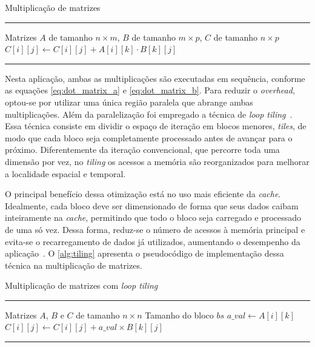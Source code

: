 \begin{algorithm}[htb]
	\caption{Multiplicação de matrizes}
	\label{alg:mul_matrix}
	\hrule
	\begin{algorithmic}[1]
		\REQUIRE Matrizes $A$ de tamanho $n \times m$, $B$ de tamanho $m \times p$, $C$ de tamanho $n \times p$
		\STATE $C[i][j] \gets C[i][j] + A[i][k] \cdot B[k][j]$
		\ENDFOR
		\ENDFOR
		\ENDFOR
	\end{algorithmic}
	\hrule
\end{algorithm}

Nesta aplicação, ambas as multiplicações são executadas em sequência, conforme as equações \autoref{eq:dot_matrix_a} e \autoref{eq:dot_matrix_b}. Para reduzir o \textit{overhead}, optou-se por utilizar uma única região paralela que abrange ambas multiplicações. Além da paralelização foi empregado a técnica de \textit{loop tiling}~\cite{bakos2016}. Essa técnica consiste em dividir o espaço de iteração em blocos menores, \textit{tiles}, de modo que cada bloco seja completamente processado antes de avançar para o próximo. Diferentemente da iteração convencional, que percorre toda uma dimensão por vez, no \textit{tiling} os acessos a memória são reorganizados para melhorar a localidade espacial e temporal.

O principal benefício dessa otimização está no uso mais eficiente da \textit{cache}. Idealmente, cada bloco deve ser dimensionado de forma que seus dados caibam inteiramente na \textit{cache}, permitindo que todo o bloco seja carregado e processado de uma só vez. Dessa forma, reduz-se o número de acessos à memória principal e evita-se o recarregamento de dados já utilizados, aumentando o desempenho da aplicação~\cite{bakos2016}. O \autoref{alg:tiling} apresenta o pseudocódigo de implementação dessa técnica na multiplicação de matrizes.

\begin{algorithm}[htb]
	\caption{Multiplicação de matrizes com \textit{loop tiling}}
	\label{alg:tiling}
	\hrule
	\begin{algorithmic}[1]
		\REQUIRE Matrizes $A$, $B$ e $C$ de tamanho $n \times n$
		\REQUIRE Tamanho do bloco $bs$
		\STATE $a\_val \gets A[i][k]$
		\STATE $C[i][j] \gets C[i][j] + a\_val \times B[k][j]$
		\ENDFOR
		\ENDFOR
		\ENDFOR
		\ENDFOR
		\ENDFOR
	\end{algorithmic}
	\hrule
	\fonte{}
\end{algorithm}

